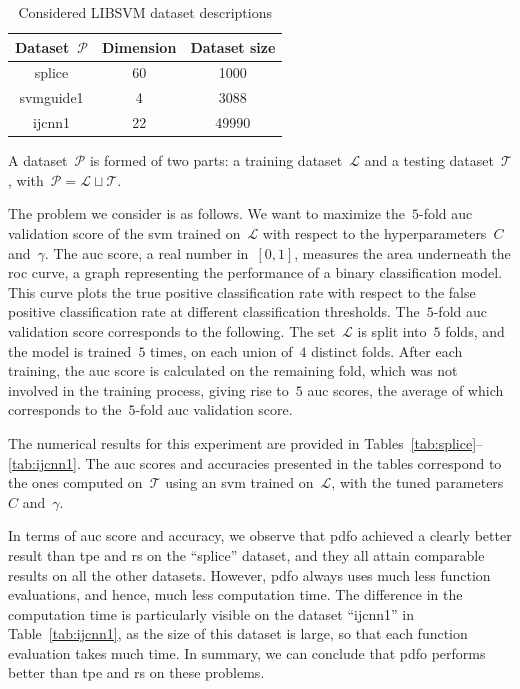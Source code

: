 \documentclass[
    smallextended,  %
    final,        %
]{svjour3}
\begin{document}
\begin{table}[ht]
    \caption{Considered LIBSVM dataset descriptions}
    \label{tab:htdata}
    \centering
    \begin{tabular}{cS[table-format=2]S[table-format=5]}
        \toprule
        Dataset~$\mathcal{P}$   & {Dimension}   & {Dataset size}\\
        \midrule
        splice                  & 60            & 1000\\
        svmguide1               & 4             & 3088\\
        ijcnn1                  & 22            & 49990\\
        \bottomrule
    \end{tabular}
\end{table}

A dataset~$\mathcal{P}$ is formed of two parts: a training dataset~$\mathcal{L}$ and a testing dataset~$\mathcal{T}$, with~$\mathcal{P} = \mathcal{L} \sqcup \mathcal{T}$.

The problem we consider is as follows.
We want to maximize the~$5$-fold \gls{auc} validation score of the \gls{svm} trained on~$\mathcal{L}$ with respect to the hyperparameters~$C$ and~$\gamma$.
The \gls{auc} score, a real number in~$[0, 1]$, measures the area underneath the \gls{roc} curve, a graph representing the performance of a binary classification model.
This curve plots the true positive classification rate with respect to the false positive classification rate at different classification thresholds.
The~$5$-fold \gls{auc} validation score corresponds to the following.
The set~$\mathcal{L}$ is split into~$5$ folds, and the model is trained~$5$ times, on each union of~$4$ distinct folds.
After each training, the \gls{auc} score is calculated on the remaining fold, which was not involved in the training process, giving rise to~$5$ \gls{auc} scores, the average of which corresponds to the~$5$-fold \gls{auc} validation score.

The numerical results for this experiment are provided in Tables~\ref{tab:splice}--\ref{tab:ijcnn1}.
The \gls{auc} scores and accuracies presented in the tables correspond to the ones computed on~$\mathcal{T}$ using an \gls{svm} trained on~$\mathcal{L}$, with the tuned parameters~$C$ and~$\gamma$.

In terms of \gls{auc} score and accuracy, we observe that \gls{pdfo} achieved a clearly better result than \gls{tpe} and \gls{rs} on the ``splice'' dataset, and they all attain comparable results on all the other datasets.
However, \gls{pdfo} always uses much less function evaluations, and hence, much less computation time.
The difference in the computation time is particularly visible on the dataset ``ijcnn1'' in Table~\ref{tab:ijcnn1}, as the size of this dataset is large, so that each function evaluation takes much time.
In summary, we can conclude that \gls{pdfo} performs better than \gls{tpe} and \gls{rs} on these problems.
\end{document}
